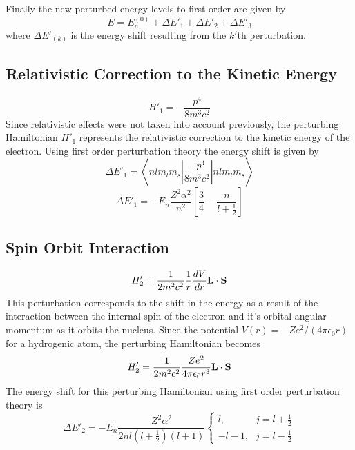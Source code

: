 \documentclass[a4paper]{IEEEtran}
\begin{document}
    Finally the new perturbed energy levels to first order are given by
    \begin{equation}
        E = E_{n}^{(0)} + \Delta E'_1 + \Delta E'_2 + \Delta E'_3
    \end{equation}
    where $\Delta E'_{(k)}$ is the energy shift resulting from the $k'$th perturbation.
    
	\subsection{Relativistic Correction to the Kinetic Energy}
	\begin{equation}
		H'_1 = - \frac{p^4}{8m^3c^2}
	\end{equation}
    Since relativistic effects were not taken into account previously, the 
    perturbing Hamiltonian $H'_1$ represents the relativistic correction
    to the kinetic energy of the electron.
    Using first order perturbation theory the energy shift is given by
    \begin{equation} 
        \Delta E'_1 = \left \langle nl m_l m_s 
                        \left|
                            \frac{-p^4}{8m^3 c^2} 
                        \right|
                      nl m_l m_s \right \rangle 
    \end{equation}
    \begin{equation}
        \Delta E'_1 = -E_n \frac{Z^2 \alpha^2}{n^2} 
                        \left[ \frac{3}{4}  - \frac{n}{l + \frac{1}{2}} \right]
    \end{equation}

	\subsection{Spin Orbit Interaction}
	\begin{equation}
		H'_2 = \frac{1}{2m^2c^2} \frac{1}{r} \frac{dV}{dr} {\bf L} \cdot {\bf S} 
	\end{equation}
    This perturbation corresponds to the shift in the energy as a result of the interaction
    between the internal spin of the electron and it's orbital angular momentum as it
    orbits the nucleus. Since the potential $V(r) = -Ze^2/(4 \pi \epsilon_0 r)$ for
    a hydrogenic atom, the perturbing Hamiltonian becomes
    \begin{equation}
        H'_2 = \frac{1}{2m^2c^2} \frac{Ze^2}{4\pi \epsilon_0 r^3} {\bf L} \cdot {\bf S}
    \end{equation}
    The energy shift for this perturbing Hamiltonian using first order perturbation theory is
    \begin{equation}
        \Delta E'_2 = -E_n \frac{Z^2 \alpha^2}{2nl(l + \frac{1}{2})(l + 1)}
        \left\{
            \begin{array}{ll}
                l       \mbox{,} &  j = l + \frac{1}{2} \\
                -l - 1  \mbox{,} &  j = l - \frac{1}{2}
            \end{array}
        \right.
    \end{equation}
\end{document}
